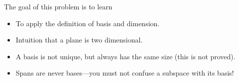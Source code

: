 \documentclass{workbook}
\newcommand{\displayonlynewpage}{\begin{displayonly}\newpage\end{displayonly}}
\newcommand{\bookonlynewpage}{\begin{bookonly}\newpage\end{bookonly}}
\begin{document}
\begin{slide}
	\bookonlynewpage
	\displayonlynewpage


	\question
	\begin{annotation}
		\begin{goals}

			The goal of this problem is to learn
			\begin{itemize}
				\item To apply the definition of basis and dimension.
				\item Intuition that a plane is two dimensional.
				\item A basis is not unique, but always has the same size (this is not proved).
				\item Spans are never bases---you must not confuse a subspace with its basis!
			\end{itemize}
		\end{goals}


\end{annotation}
\end{slide}
\end{document}
